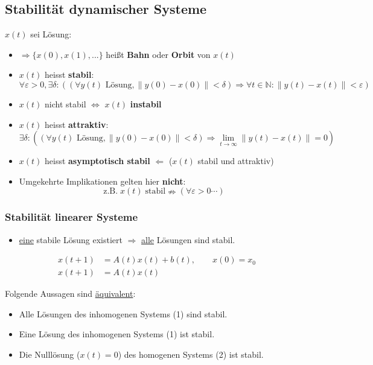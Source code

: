 \documentclass[a4paper]{article}
\begin{document}
\subsection{Stabilität dynamischer Systeme}
$x(t)$ sei Lösung:

\begin{itemize}
	\item $\Rightarrow \{
			x(0), x(1), ...
		\} $ heißt \textbf{Bahn} oder \textbf{Orbit} von $x(t)$
	\item $x(t)$ heisst \textbf{stabil}:
		\[
		\forall \varepsilon > 0, \exists \delta :
		\left(
			(
				\forall y(t) \text{ Lösung}, \| y(0) - x(0) \| < \delta
			)
			\Rightarrow \forall t \in \mathbb{N}:
			\| y(t) - x(t) \| < \varepsilon
		\right) 
		\] 
	\item $x(t)$ nicht stabil $\Leftrightarrow$ $x(t)$ \textbf{instabil} 
	\item $x(t)$ heisst \textbf{attraktiv}:
		\[
		\exists \delta : \left(
			(
				\forall y(t) \text{ Lösung}, \| y(0) - x(0) \| < \delta
			)
			\Rightarrow \lim_{t \to \infty} 
			\| y(t) - x(t) \| = 0
		\right) 
		\] 
	\item $x(t)$ heisst \textbf{asymptotisch stabil} 
		$\Leftarrow$ ($x(t)$ stabil und attraktiv)
	\item Umgekehrte Implikationen gelten hier \textbf{nicht}:
		\[
			\text{z.B.} \; x(t) \; \text{stabil} \nRightarrow
			\left(
				\forall \varepsilon > 0 \cdots
			\right) 
		\] 
\end{itemize}

\subsubsection{Stabilität linearer Systeme}

\begin{itemize}
	\item \underline{eine} stabile Lösung existiert $\Rightarrow$ \underline{alle}
		Lösungen sind stabil.
\end{itemize}
\begin{align}
	x(t+1) &= A(t) x(t) + b(t), \qquad x(0) = x_0 \\
	x(t+1) &= A(t) x(t)
\end{align}

Folgende Aussagen sind \underline{äquivalent}:

\begin{itemize}
	\item Alle Lösungen des inhomogenen Systems (1) sind stabil.
	\item Eine Lösung des inhomogenen Systems (1) ist stabil.
	\item Die Nulllösung ($x(t) = 0$) des homogenen Systems (2) ist stabil.
\end{itemize}
\end{document}
